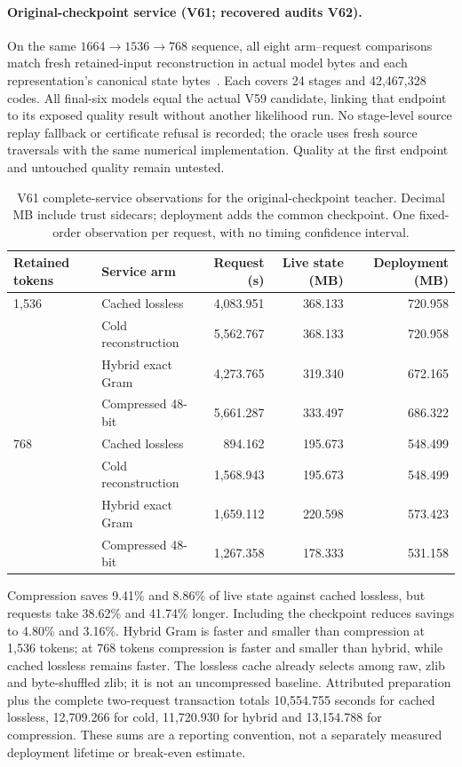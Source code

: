\documentclass[10pt,twocolumn,letterpaper]{article}
\begin{document}
\paragraph{Original-checkpoint service (V61; recovered audits V62).}
On the same $1664\to1536\to768$ sequence, all eight arm--request comparisons
match fresh retained-input reconstruction in actual model bytes and each
representation's canonical state bytes~\cite{v62terminal}. Each covers 24 stages
and 42,467,328 codes. All final-six models equal the actual V59 candidate, linking
that endpoint to its exposed quality result without another likelihood run.
No stage-level source replay fallback or certificate refusal is recorded; the
oracle uses fresh source traversals with the same numerical implementation.
Quality at the first endpoint and untouched quality remain untested.

\begin{table}[t]
\centering\small
\begin{tabular}{llrrr}
\toprule
Retained tokens & Service arm & Request (s) & Live state (MB) & Deployment (MB) \\
\midrule
1,536 & Cached lossless & 4,083.951 & 368.133 & 720.958 \\
  & Cold reconstruction & 5,562.767 & 368.133 & 720.958 \\
  & Hybrid exact Gram & 4,273.765 & 319.340 & 672.165 \\
  & Compressed 48-bit & 5,661.287 & 333.497 & 686.322 \\
\midrule
768 & Cached lossless & 894.162 & 195.673 & 548.499 \\
  & Cold reconstruction & 1,568.943 & 195.673 & 548.499 \\
  & Hybrid exact Gram & 1,659.112 & 220.598 & 573.423 \\
  & Compressed 48-bit & 1,267.358 & 178.333 & 531.158 \\
\bottomrule
\end{tabular}
\caption{V61 complete-service observations for the original-checkpoint teacher.
Decimal MB include trust sidecars; deployment adds the common checkpoint.
One fixed-order observation per request, with no timing confidence interval.}
\label{tab:v61}
\end{table}

Compression saves 9.41\% and 8.86\% of live state against cached lossless,
but requests take 38.62\% and 41.74\% longer. Including the checkpoint reduces
savings to 4.80\% and 3.16\%. Hybrid Gram is faster and smaller than compression
at 1,536 tokens; at 768 tokens compression is faster and smaller than hybrid,
while cached lossless remains faster. The lossless cache already selects among
raw, zlib and byte-shuffled zlib; it is not an uncompressed baseline.
Attributed preparation plus the complete two-request transaction totals
10,554.755 seconds for cached lossless, 12,709.266 for cold, 11,720.930 for hybrid
and 13,154.788 for compression. These sums are a reporting convention, not a
separately measured deployment lifetime or break-even estimate.
\end{document}
